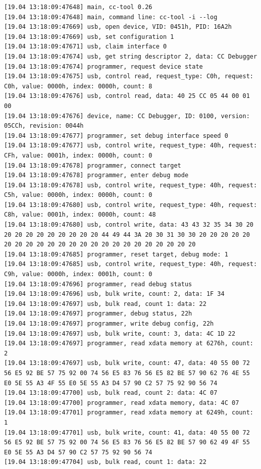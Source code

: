 \begin{verbatim}
[19.04 13:18:09:47648] main, cc-tool 0.26
[19.04 13:18:09:47648] main, command line: cc-tool -i --log 
[19.04 13:18:09:47669] usb, open device, VID: 0451h, PID: 16A2h
[19.04 13:18:09:47669] usb, set configuration 1
[19.04 13:18:09:47671] usb, claim interface 0
[19.04 13:18:09:47674] usb, get string descriptor 2, data: CC Debugger
[19.04 13:18:09:47674] programmer, request device state
[19.04 13:18:09:47675] usb, control read, request_type: C0h, request: C0h, value: 0000h, index: 0000h, count: 8
[19.04 13:18:09:47676] usb, control read, data: 40 25 CC 05 44 00 01 00
[19.04 13:18:09:47676] device, name: CC Debugger, ID: 0100, version: 05CCh, revision: 0044h
[19.04 13:18:09:47677] programmer, set debug interface speed 0
[19.04 13:18:09:47677] usb, control write, request_type: 40h, request: CFh, value: 0001h, index: 0000h, count: 0
[19.04 13:18:09:47678] programmer, connect target
[19.04 13:18:09:47678] programmer, enter debug mode
[19.04 13:18:09:47678] usb, control write, request_type: 40h, request: C5h, value: 0000h, index: 0000h, count: 0
[19.04 13:18:09:47680] usb, control write, request_type: 40h, request: C8h, value: 0001h, index: 0000h, count: 48
[19.04 13:18:09:47680] usb, control write, data: 43 43 32 35 34 30 20 20 20 20 20 20 20 20 20 20 44 49 44 3A 20 30 31 30 30 20 20 20 20 20 20 20 20 20 20 20 20 20 20 20 20 20 20 20 20 20 20 20
[19.04 13:18:09:47685] programmer, reset target, debug mode: 1
[19.04 13:18:09:47685] usb, control write, request_type: 40h, request: C9h, value: 0000h, index: 0001h, count: 0
[19.04 13:18:09:47696] programmer, read debug status
[19.04 13:18:09:47696] usb, bulk write, count: 2, data: 1F 34
[19.04 13:18:09:47697] usb, bulk read, count 1: data: 22
[19.04 13:18:09:47697] programmer, debug status, 22h
[19.04 13:18:09:47697] programmer, write debug config, 22h
[19.04 13:18:09:47697] usb, bulk write, count: 3, data: 4C 1D 22
[19.04 13:18:09:47697] programmer, read xdata memory at 6276h, count: 2
[19.04 13:18:09:47697] usb, bulk write, count: 47, data: 40 55 00 72 56 E5 92 BE 57 75 92 00 74 56 E5 83 76 56 E5 82 BE 57 90 62 76 4E 55 E0 5E 55 A3 4F 55 E0 5E 55 A3 D4 57 90 C2 57 75 92 90 56 74
[19.04 13:18:09:47700] usb, bulk read, count 2: data: 4C 07
[19.04 13:18:09:47700] programmer, read xdata memory, data: 4C 07
[19.04 13:18:09:47701] programmer, read xdata memory at 6249h, count: 1
[19.04 13:18:09:47701] usb, bulk write, count: 41, data: 40 55 00 72 56 E5 92 BE 57 75 92 00 74 56 E5 83 76 56 E5 82 BE 57 90 62 49 4F 55 E0 5E 55 A3 D4 57 90 C2 57 75 92 90 56 74
[19.04 13:18:09:47704] usb, bulk read, count 1: data: 22

\end{verbatim}
